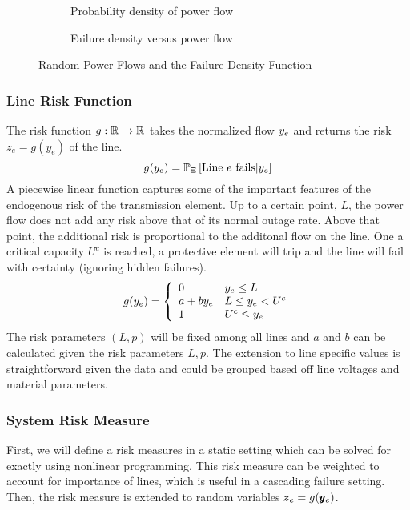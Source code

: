 \begin{figure}
  \centering
  \begin{subfigure}[b]{0.445\textwidth}
    
    \caption{Probability density of power flow}
  \end{subfigure}
  \begin{subfigure}[b]{.445\textwidth}
    
    \caption{Failure density versus power flow}
  \end{subfigure}
  \caption{Random Power Flows and the Failure Density Function}
\end{figure}

\subsubsection*{Line Risk Function}
The risk function $g : \mathbb{R}^{} \rightarrow \mathbb{R}^{}$ takes the normalized flow $y_e$ and returns the risk $z_e = g(y_e)$ of the line.  
\begin{equation}
 g(y_e) = \mathbb{P}_{\Xi} \left[ \text{Line }e\text{ fails} | y_e \right] 
\end{equation}
A piecewise linear function captures some of the important features of the endogenous risk of the transmission element.  Up to a certain point, $L$, the power flow does not add any risk above that of its normal outage rate.  Above that point, the additional risk is proportional to the additonal flow on the line.  One a critical capacity $U^c$ is reached, a protective element will trip and the line will fail with certainty (ignoring hidden failures).  
\begin{equation}\label{pwl_risk}
g(y_e) = \left\{ \begin{array}{l l}
  0 & y_e \leq L \\
  a + b y_e & L \leq y_e < U^c \\
  1 & U^c \leq y_e 
\end{array}
\right.
\end{equation}
The risk parameters $(L, p)$ will be fixed among all lines and  $a$ and $b$ can be calculated given the risk parameters $L,p$. 
\endnote{}
The extension to line specific values is straightforward given the data and could be grouped based off line voltages and material parameters.


\subsubsection*{System Risk Measure}
First, we will define a risk measures in a static setting which can be solved for exactly using nonlinear programming. This risk measure can be weighted to account for importance of lines, which is useful in a cascading failure setting.
\endnote{}
Then, the risk measure is extended to random variables $\pmb{z}_e = g( \pmb{y}_e )$.


